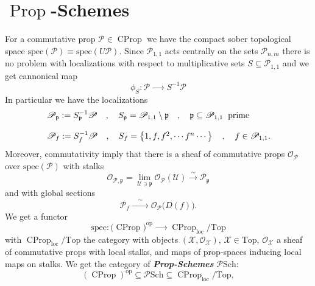 \documentclass[leqno]{article}
\renewcommand{\top}{\text{Top}}
\newcommand{\psch}{\text{$\biop$Sch}}
\newcommand{\xspace}{\mathcal{X}}
\newcommand{\pid}{\mathfrak{p}}
\newcommand{\myemph}[1]{{\it{\bf{#1}}}}
\newcommand{\op}{\text{op}}
\newcommand{\bigo}{\mathcal{O} }
\newcommand{\biop}{\mathscr{P}}
\DeclareMathOperator{\prop}{Prop}
\DeclareMathOperator{\cprop}{CProp}
\numberwithin{equation}{section}
\begin{document}
\section{$\prop$-Schemes} \label{sec:11}
For a commutative prop $\biop\in\cprop$ we have the compact sober topological space
$\text{spec}(\biop)\equiv \text{spec}(U\biop)$. Since $\biop_{1,1}$ acts centrally on the sets
$\biop_{n,m}$ there is no problem with localizations with respect to multiplicative sets
$S\subseteq\biop_{1,1}$ and we get cannonical map 
\begin{equation}
				\phi_{S}:\biop\xrightarrow{\qquad} S^{-1}\biop
				\label{eq:11.1}
\end{equation}
In particular we have the localizations
\begin{equation}
				\begin{array}[H]{l}
				\biop_{\pid}:=S_{\pid}^{-1}\biop \quad , \quad S_{\pid}=\biop_{1,1}\setminus \pid
								\quad, \quad \pid\subseteq \biop_{1,1}\;\; \text{prime} \\\\
								\biop_{f}:= S_{f}^{-1}\biop\quad , \quad S_{f}=\left\{ 1,f,f^{2},\cdots
								f^{n}\cdots \right\}\quad , \quad f\in\biop_{1,1}.
				\end{array}
				\label{eq:11.2}
\end{equation}
Moreover, commutativity imply that there is a sheaf of commutative props $\bigo_{\biop}$
over $\text{spec}(\biop)$ with  stalks 
\begin{equation}
				\bigo_{\biop, \pid} =
				\lim\limits_{\mathscr{U}\ni\pid}\bigo_{\biop}(\mathscr{U})\xrightarrow{\sim}
				\biop_{\pid}
				\label{eq:11.3}
\end{equation}
and with global sections
\begin{equation}
				\biop_{f}\xrightarrow{\quad\sim\quad} \bigo_{\biop}\big(D(f)\big).
				\label{eq:11.4}
\end{equation}
We get a functor 
\begin{equation}
				\text{spec}: \big(\cprop)^{\op}\xrightarrow{\qquad}\cprop_{\text{loc}}/\top
				\label{eq:11.5}
\end{equation}
with $\cprop_{\text{loc}}/\top$ the category with objects $(\xspace,\bigo_{\xspace})$,
$\xspace\in\top$, $\bigo_{\xspace}$ a sheaf of commutative props with local stalks, and maps of
prop-spaces inducing local maps on stalks. We get the category of \myemph{Prop-Schemes}
$\psch$: 
\begin{equation}
				(\cprop)^{\op}\subseteq \psch \subseteq \cprop_{\text{loc}}/\top , 
				\label{eq:11.6}
\end{equation}
\end{document}
